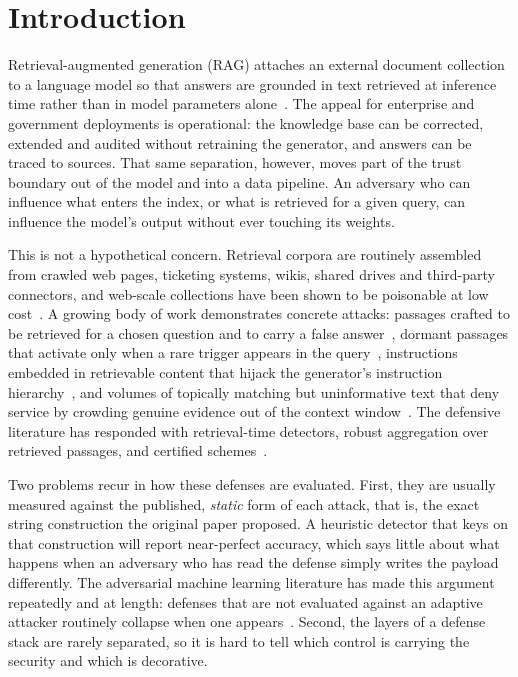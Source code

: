 
\section{Introduction}

Retrieval-augmented generation (RAG) attaches an external document collection to a language
model so that answers are grounded in text retrieved at inference time rather than in model
parameters alone~\citep{lewis2020,guu2020,gao2024survey}. The appeal for enterprise and
government deployments is operational: the knowledge base can be corrected, extended and
audited without retraining the generator, and answers can be traced to sources. That same
separation, however, moves part of the trust boundary out of the model and into a data
pipeline. An adversary who can influence what enters the index, or what is retrieved for a
given query, can influence the model's output without ever touching its weights.

This is not a hypothetical concern. Retrieval corpora are routinely assembled from
crawled web pages, ticketing systems, wikis, shared drives and third-party connectors, and
web-scale collections have been shown to be poisonable at low cost~\citep{carlini2024poison}.
A growing body of work demonstrates concrete attacks: passages crafted to be retrieved for a
chosen question and to carry a false answer~\citep{zou2024,zhong2023}, dormant passages that
activate only when a rare trigger appears in the query~\citep{xue2024badrag,cheng2024trojanrag,chaudhari2024phantom},
instructions embedded in retrievable content that hijack the generator's instruction
hierarchy~\citep{greshake2023,liu2024formalizing}, and volumes of topically matching but
uninformative text that deny service by crowding genuine evidence out of the
context window~\citep{shafran2024jamming}. The defensive literature has responded with
retrieval-time detectors, robust aggregation over retrieved passages, and certified
schemes~\citep{xiang2024robustrag,zhou2025trustrag,weller2024defending}.

Two problems recur in how these defenses are evaluated. First, they are usually measured
against the published, \emph{static} form of each attack, that is, the exact string
construction the original paper proposed. A heuristic detector that keys on that construction will report
near-perfect accuracy, which says little about what happens when an adversary who has read the
defense simply writes the payload differently. The adversarial machine learning literature has
made this argument repeatedly and at length: defenses that are not evaluated against an
adaptive attacker routinely collapse when
one appears~\citep{carlini2017bypassing,athalye2018obfuscated,tramer2020adaptive,carlini2019evaluating}.
Second, the layers of a defense stack are rarely separated, so it is hard to tell which control
is carrying the security and which is decorative.

